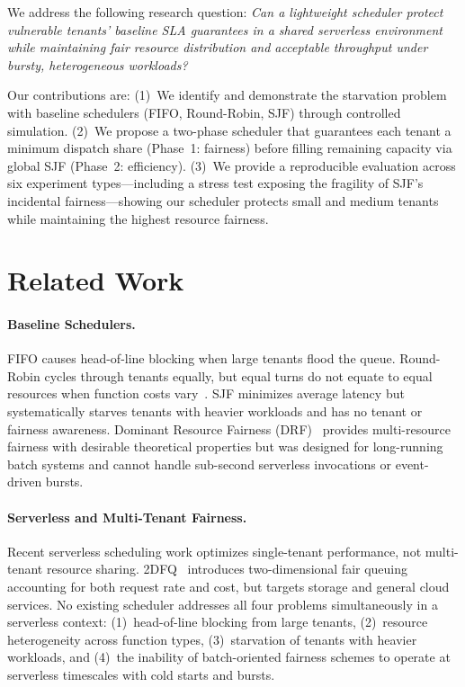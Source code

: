 \documentclass[runningheads]{llncs}
\begin{document}
We address the following research question: \emph{Can a lightweight scheduler protect vulnerable tenants' baseline SLA guarantees in a shared serverless environment while maintaining fair resource distribution and acceptable throughput under bursty, heterogeneous workloads?}

Our contributions are: (1)~We identify and demonstrate the starvation problem with baseline schedulers (FIFO, Round-Robin, SJF) through controlled simulation. (2)~We propose a two-phase scheduler that guarantees each tenant a minimum dispatch share (Phase~1: fairness) before filling remaining capacity via global SJF (Phase~2: efficiency). (3)~We provide a reproducible evaluation across six experiment types---including a stress test exposing the fragility of SJF's incidental fairness---showing our scheduler protects small and medium tenants while maintaining the highest resource fairness.

\section{Related Work}\label{sec:related}

\paragraph{Baseline Schedulers.}
FIFO causes head-of-line blocking when large tenants flood the queue. Round-Robin cycles through tenants equally, but equal turns do not equate to equal resources when function costs vary~\cite{mace20162dfq}. SJF minimizes average latency but systematically starves tenants with heavier workloads and has no tenant or fairness awareness. Dominant Resource Fairness (DRF)~\cite{ghodsi2011dominant} provides multi-resource fairness with desirable theoretical properties but was designed for long-running batch systems and cannot handle sub-second serverless invocations or event-driven bursts.

\paragraph{Serverless and Multi-Tenant Fairness.}
Recent serverless scheduling work optimizes single-tenant performance, not multi-tenant resource sharing. 2DFQ~\cite{mace20162dfq} introduces two-dimensional fair queuing accounting for both request rate and cost, but targets storage and general cloud services. No existing scheduler addresses all four problems simultaneously in a serverless context: (1)~head-of-line blocking from large tenants, (2)~resource heterogeneity across function types, (3)~starvation of tenants with heavier workloads, and (4)~the inability of batch-oriented fairness schemes to operate at serverless timescales with cold starts and bursts.
\end{document}
